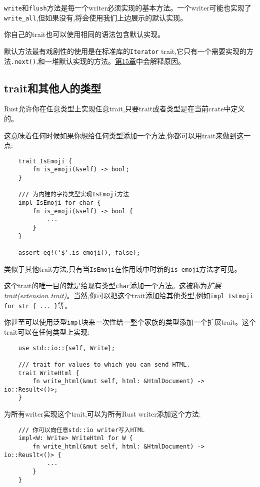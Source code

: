 \texttt{write}和\texttt{flush}方法是每一个writer必须实现的基本方法。一个writer可能也实现了\texttt{write\_all},但如果没有,将会使用我们上边展示的默认实现。

你自己的trait也可以使用相同的语法包含默认实现。

默认方法最有戏剧性的使用是在标准库的\texttt{Iterator} trait,它只有一个需要实现的方法\texttt{.next()},和一堆默认实现的方法。\hyperref[ch15]{第15章}中会解释原因。

\subsection{trait和其他人的类型}\label{OrphanRule}
Rust允许你在任意类型上实现任意trait,只要trait或者类型是在当前crate中定义的。

这意味着任何时候如果你想给任何类型添加一个方法,你都可以用trait来做到这一点:
\begin{verbatim}
    trait IsEmoji {
        fn is_emoji(&self) -> bool;
    }

    /// 为内建的字符类型实现IsEmoji方法
    impl IsEmoji for char {
        fn is_emoji(&self) -> bool {
            ...
        }
    }

    assert_eq!('$'.is_emoji(), false);
\end{verbatim}

类似于其他trait方法,只有当\texttt{IsEmoji}在作用域中时新的\texttt{is\_emoji}方法才可见。

这个trait的唯一目的就是给现有类型\texttt{char}添加一个方法。这被称为\emph{扩展trait(extension trait)}。当然,你可以把这个trait添加给其他类型,例如\texttt{impl IsEmoji for str \{ ... \}}等。

你甚至可以使用泛型\texttt{impl}块来一次性给一整个家族的类型添加一个扩展trait。这个trait可以在任何类型上实现:
\begin{verbatim}
    use std::io::{self, Write};

    /// trait for values to which you can send HTML.
    trait WriteHtml {
        fn write_html(&mut self, html: &HtmlDocument) -> io::Result<()>;
    }
\end{verbatim}

为所有writer实现这个trait,可以为所有Rust writer添加这个方法:
\begin{verbatim}
    /// 你可以向任意std::io writer写入HTML
    impl<W: Write> WriteHtml for W {
        fn write_html(&mut self, html: &HtmlDocument) -> io::Reuslt<()> {
            ...
        }
    }
\end{verbatim}

